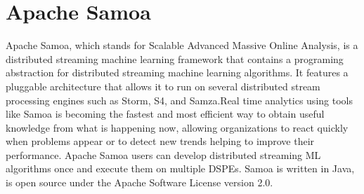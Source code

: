 \section{Apache Samoa}
Apache Samoa, which stands for Scalable Advanced Massive Online Analysis, is a
distributed streaming machine learning framework that contains a programing
abstraction for distributed streaming machine learning algorithms.
\cite{samoa-web} It features a pluggable architecture that allows it to run on
several distributed stream processing engines such as Storm, S4, and Samza.Real
time analytics using tools like Samoa is becoming the fastest and most efficient
way to obtain useful knowledge from what is happening now, allowing
organizations to react quickly when problems appear or to detect new trends
helping to improve their performance. \cite{samoa-MUSE} Apache Samoa users can
develop distributed streaming ML algorithms once and execute them on multiple
DSPEs. Samoa is written in Java, is open source under the Apache Software
License version 2.0.\cite{ samoa-JMLR}

